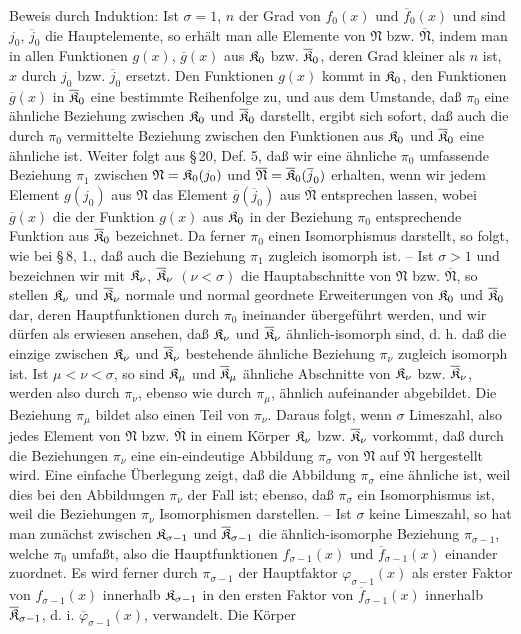 Beweis durch Induktion: Ist $\sigma=1$, $n$ der Grad von $f_0(x)$ und $\overline f_0(x)$ und sind $j_0$, $\overline j_0$ die Hauptelemente, so erhält man alle Elemente von $\mathfrak N$ bzw. $\overline{\mathfrak N}$, indem man in allen Funktionen $g(x)$, $\overline g(x)$ aus $\mathfrak K_0$ bzw. $\overline{\mathfrak K}_0$, deren Grad kleiner als $n$ ist, $x$ durch $j_0$ bzw. $\overline j_0$ ersetzt. Den Funktionen $g(x)$ kommt in $\mathfrak K_0$, den Funktionen $\overline g(x)$ in $\overline{\mathfrak K}_0$ eine bestimmte Reihenfolge zu, und aus dem Umstande, daß $\pi_0$ eine ähnliche Beziehung zwischen $\mathfrak K_0$ und $\overline{\mathfrak K}_0$ darstellt, ergibt sich sofort, daß auch die durch $\pi_0$ vermittelte Beziehung zwischen den Funktionen aus $\mathfrak K_0$ und $\overline{\mathfrak K}_0$ eine ähnliche ist. Weiter folgt aus \S\,20, Def. 5, daß wir eine ähnliche $\pi_0$ umfassende Beziehung $\pi_1$ zwischen $\mathfrak N=\mathfrak K_0(j_0)$ und $\overline{\mathfrak N}=\overline{\mathfrak K}_0(\overline j_0)$ erhalten, wenn wir jedem Element $g(j_0)$ aus $\mathfrak N$ das Element $\overline g(\overline j_0)$ aus $\overline{\mathfrak N}$ entsprechen lassen, wobei $\overline g(x)$ die der Funktion $g(x)$ aus $\mathfrak K_0$ in der Beziehung $\pi_0$ entsprechende Funktion aus $\overline{\mathfrak K}_0$ bezeichnet. Da ferner $\pi_0$ einen Isomorphismus darstellt, so folgt, wie bei \S\,8, 1., daß auch die Beziehung $\pi_1$ zugleich isomorph ist. -- Ist $\sigma>1$ und bezeichnen wir mit $\mathfrak K_\nu$, $\overline{\mathfrak K}_\nu$ $(\nu<\sigma)$ die Hauptabschnitte von $\mathfrak N$ bzw. $\overline{\mathfrak N}$, so stellen $\mathfrak K_\nu$ und $\overline{\mathfrak K}_\nu$ normale und normal geordnete Erweiterungen von $\mathfrak K_0$ und $\overline{\mathfrak K}_0$ dar, deren Hauptfunktionen durch $\pi_0$ ineinander übergeführt werden, und wir dürfen als erwiesen ansehen, daß $\mathfrak K_\nu$ und $\overline{\mathfrak K}_\nu$ ähnlich-isomorph sind, d. h. daß die einzige zwischen $\mathfrak K_\nu$ und $\overline{\mathfrak K}_\nu$ bestehende ähnliche Beziehung $\pi_\nu$ zugleich isomorph ist. Ist $\mu<\nu<\sigma$, so sind $\mathfrak K_\mu$ und $\overline{\mathfrak K}_\mu$ ähnliche Abschnitte von $\mathfrak K_\nu$ bzw. $\overline{\mathfrak K}_\nu$, werden also durch $\pi_\nu$, ebenso wie durch $\pi_\mu$, ähnlich aufeinander abgebildet. Die Beziehung $\pi_\mu$ bildet also einen Teil von $\pi_\nu$. Daraus folgt, wenn $\sigma$ Limeszahl, also jedes Element von $\mathfrak N$ bzw. $\overline{\mathfrak N}$ in einem Körper $\mathfrak K_\nu$ bzw. $\overline{\mathfrak K}_\nu$ vorkommt, daß durch die Beziehungen $\pi_\nu$ eine ein-eindeutige Abbildung $\pi_\sigma$ von $\mathfrak N$ auf $\overline{\mathfrak N}$ hergestellt wird. Eine einfache Überlegung zeigt, daß die Abbildung $\pi_\sigma$ eine ähnliche ist, weil dies bei den Abbildungen $\pi_\nu$ der Fall ist; ebenso, daß $\pi_\sigma$ ein Isomorphismus ist, weil die Beziehungen $\pi_\nu$ Isomorphismen darstellen. -- Ist $\sigma$ keine Limeszahl, so hat man zunächst zwischen $\mathfrak K_{\sigma-1}$ und $\overline{\mathfrak K}_{\sigma-1}$ die ähnlich-isomorphe Beziehung $\pi_{\sigma-1}$, welche $\pi_0$ umfaßt, also die Hauptfunktionen $f_{\sigma-1}(x)$ und $\overline f_{\sigma-1}(x)$ einander zuordnet. Es wird ferner durch $\pi_{\sigma-1}$ der Hauptfaktor $\varphi_{\sigma-1}(x)$ als erster Faktor von $f_{\sigma-1}(x)$ innerhalb $\mathfrak K_{\sigma-1}$ in den ersten Faktor von $\overline f_{\sigma-1}(x)$ innerhalb $\overline{\mathfrak K}_{\sigma-1}$, d. i. $\overline\varphi_{\sigma-1}(x)$, verwandelt. Die Körper 